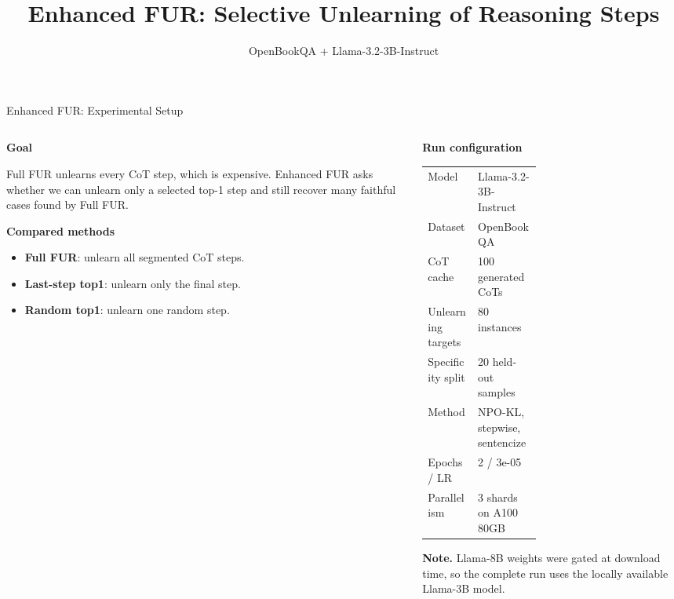 \documentclass[aspectratio=169,10pt]{beamer}
\title{Enhanced FUR: Selective Unlearning of Reasoning Steps}
\author{OpenBookQA + Llama-3.2-3B-Instruct}
\date{}
\begin{document}
\begin{frame}{Enhanced FUR: Experimental Setup}
\small
\begin{columns}[T,onlytextwidth]
  \begin{column}{0.48\textwidth}
    \textbf{Goal}

    \vspace{0.4em}
    Full FUR unlearns every CoT step, which is expensive.
    Enhanced FUR asks whether we can unlearn only a selected top-1 step and
    still recover many faithful cases found by Full FUR.

    \vspace{1em}
    \textbf{Compared methods}
    \begin{itemize}
      \item \textbf{Full FUR}: unlearn all segmented CoT steps.
      \item \textbf{Last-step top1}: unlearn only the final step.
      \item \textbf{Random top1}: unlearn one random step.
    \end{itemize}
  \end{column}

  \begin{column}{0.48\textwidth}
    \textbf{Run configuration}

    \vspace{0.3em}
    \begin{tabularx}{\linewidth}{p{0.44\linewidth}X}
      \toprule
      Model & Llama-3.2-3B-Instruct \\
      Dataset & OpenBookQA \\
      CoT cache & 100 generated CoTs \\
      Unlearning targets & 80 instances \\
      Specificity split & 20 held-out samples \\
      Method & NPO-KL, stepwise, sentencize \\
      Epochs / LR & 2 / 3e-05 \\
      Parallelism & 3 shards on A100 80GB \\
      \bottomrule
    \end{tabularx}

    \vspace{0.7em}
    \textbf{Note.} Llama-8B weights were gated at download time, so the complete
    run uses the locally available Llama-3B model.
  \end{column}
\end{columns}
\end{frame}
\end{document}
